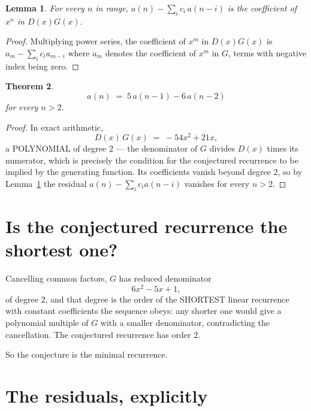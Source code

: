 \documentclass[11pt,a4paper]{article}
\theoremstyle{plain}
\newtheorem{theorem}{Theorem}
\newtheorem{lemma}[theorem]{Lemma}
\theoremstyle{definition}
\begin{document}
\begin{lemma}\label{lem:key}
For every $n$ in range, $a(n)-\sum_i c_i\,a(n-i)$ is the coefficient of $x^{n}$ in
$D(x)G(x)$.
\end{lemma}

\begin{proof}
Multiplying power series, the coefficient of $x^{m}$ in $D(x)G(x)$ is
$a_m-\sum_i c_i a_{m-i}$ where $a_m$ denotes the coefficient of $x^{m}$ in $G$, terms with
negative index being zero.
\end{proof}

\begin{theorem}
\[
a(n)\;=\;5\,a(n-1) - 6\,a(n-2)
\]
for every $n>2$.
\end{theorem}

\begin{proof}
In exact arithmetic,
\[
D(x)\,G(x)\;=\;- 54 x^{2} + 21 x,
\]
a POLYNOMIAL of degree $2$ --- the denominator of $G$ divides $D(x)$ times its numerator,
which is precisely the condition for the conjectured recurrence to be implied by the
generating function. Its coefficients vanish beyond degree $2$, so by
Lemma~\ref{lem:key} the residual $a(n)-\sum_ic_ia(n-i)$ vanishes for every
$n>2$.
\end{proof}

\section{Is the conjectured recurrence the shortest one?}

Cancelling common factors, $G$ has reduced denominator
\[
6 x^{2} - 5 x + 1,
\]
of degree $2$, and that degree is the order of the SHORTEST linear recurrence with
constant coefficients the sequence obeys: any shorter one would give a polynomial multiple of
$G$ with a smaller denominator, contradicting the cancellation. The conjectured recurrence has
order $2$.

So the conjecture is the minimal recurrence.

\section{The residuals, explicitly}
\end{document}
